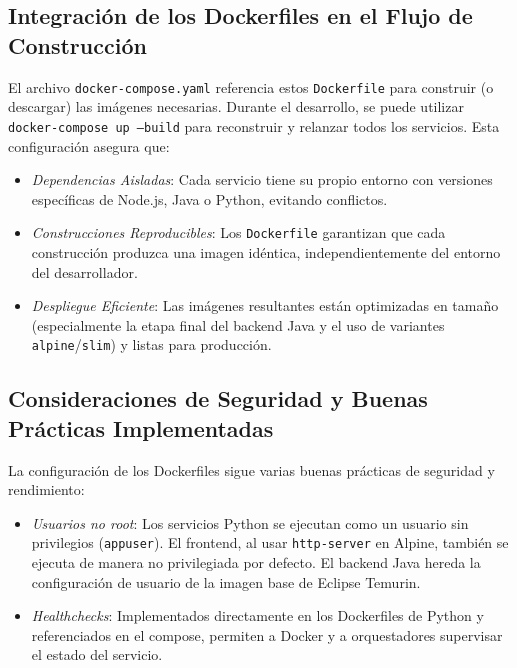 \documentclass{article}
\begin{document}
\subsection{Integración de los Dockerfiles en el Flujo de Construcción}
El archivo \texttt{docker-compose.yaml} referencia estos \texttt{Dockerfile} para construir (o descargar) las imágenes necesarias. Durante el desarrollo, se puede utilizar \texttt{docker-compose up --build} para reconstruir y relanzar todos los servicios. Esta configuración asegura que:

\begin{itemize}
\item \textit{Dependencias Aisladas}: Cada servicio tiene su propio entorno con versiones específicas de Node.js, Java o Python, evitando conflictos.
\item \textit{Construcciones Reproducibles}: Los \texttt{Dockerfile} garantizan que cada construcción produzca una imagen idéntica, independientemente del entorno del desarrollador.
\item \textit{Despliegue Eficiente}: Las imágenes resultantes están optimizadas en tamaño (especialmente la etapa final del backend Java y el uso de variantes \texttt{alpine}/\texttt{slim}) y listas para producción.
\end{itemize}

\subsection{Consideraciones de Seguridad y Buenas Prácticas Implementadas}
La configuración de los Dockerfiles sigue varias buenas prácticas de seguridad y rendimiento:

\begin{itemize}
\item \textit{Usuarios no root}: Los servicios Python se ejecutan como un usuario sin privilegios (\texttt{appuser}). El frontend, al usar \texttt{http-server} en Alpine, también se ejecuta de manera no privilegiada por defecto. El backend Java hereda la configuración de usuario de la imagen base de Eclipse Temurin.
\item \textit{Healthchecks}: Implementados directamente en los Dockerfiles de Python y referenciados en el compose, permiten a Docker y a orquestadores supervisar el estado del servicio.
\end{itemize}

\nocite{*}  
  
        
\end{document}
